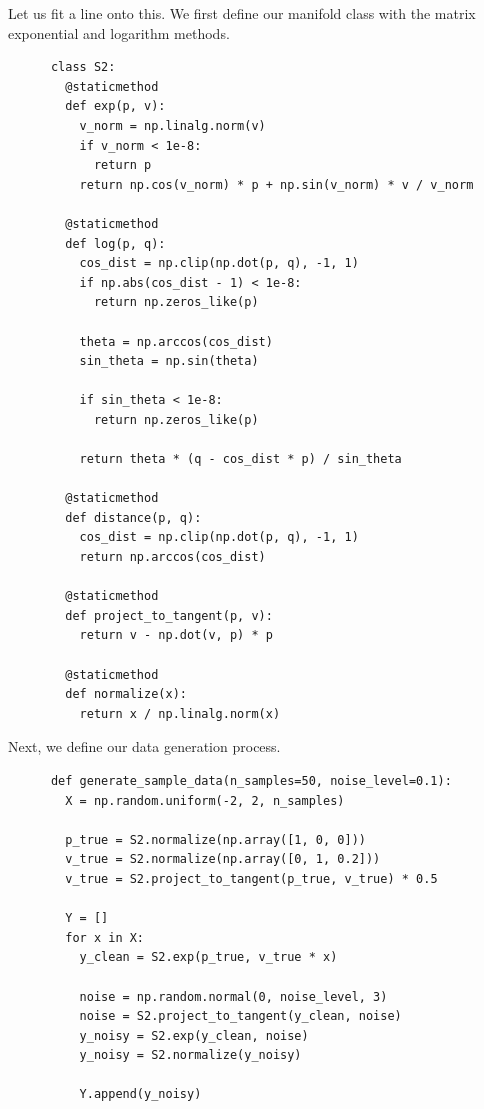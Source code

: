   \begin{example}
    \label{ex:code-walkthrough}
    Let us fit a line onto this. We first define our manifold class with the matrix exponential and logarithm methods. 

    \begin{lstlisting}
      class S2:
        @staticmethod
        def exp(p, v):
          v_norm = np.linalg.norm(v)
          if v_norm < 1e-8:
            return p
          return np.cos(v_norm) * p + np.sin(v_norm) * v / v_norm
        
        @staticmethod
        def log(p, q):
          cos_dist = np.clip(np.dot(p, q), -1, 1)
          if np.abs(cos_dist - 1) < 1e-8:
            return np.zeros_like(p)
          
          theta = np.arccos(cos_dist)
          sin_theta = np.sin(theta)
          
          if sin_theta < 1e-8:
            return np.zeros_like(p)
          
          return theta * (q - cos_dist * p) / sin_theta
        
        @staticmethod
        def distance(p, q):
          cos_dist = np.clip(np.dot(p, q), -1, 1)
          return np.arccos(cos_dist)
        
        @staticmethod
        def project_to_tangent(p, v):
          return v - np.dot(v, p) * p
        
        @staticmethod
        def normalize(x):
          return x / np.linalg.norm(x)
    \end{lstlisting}

    Next, we define our data generation process. 

    \begin{lstlisting}
      def generate_sample_data(n_samples=50, noise_level=0.1):
        X = np.random.uniform(-2, 2, n_samples)
        
        p_true = S2.normalize(np.array([1, 0, 0]))
        v_true = S2.normalize(np.array([0, 1, 0.2]))
        v_true = S2.project_to_tangent(p_true, v_true) * 0.5
        
        Y = []
        for x in X:
          y_clean = S2.exp(p_true, v_true * x)
          
          noise = np.random.normal(0, noise_level, 3)
          noise = S2.project_to_tangent(y_clean, noise)
          y_noisy = S2.exp(y_clean, noise)
          y_noisy = S2.normalize(y_noisy)
          
          Y.append(y_noisy)
        

\end{lstlisting}
\end{example}
